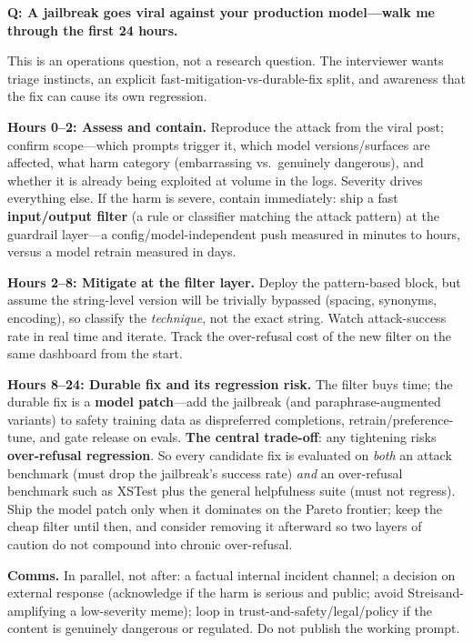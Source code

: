 \begin{interviewq}
\textbf{Q: A jailbreak goes viral against your production model---walk me through the first 24 hours.}

 \quad {} \quad \badgefreq{\freqmed}

\stronganswer

This is an operations question, not a research question. The interviewer wants triage instincts, an explicit fast-mitigation-vs-durable-fix split, and awareness that the fix can cause its own regression.

\textbf{Hours 0--2: Assess and contain.} Reproduce the attack from the viral post; confirm scope---which prompts trigger it, which model versions/surfaces are affected, what harm category (embarrassing vs.\ genuinely dangerous), and whether it is already being exploited at volume in the logs. Severity drives everything else. If the harm is severe, contain immediately: ship a fast \textbf{input/output filter} (a rule or classifier matching the attack pattern) at the guardrail layer---a config/model-independent push measured in minutes to hours, versus a model retrain measured in days.

\textbf{Hours 2--8: Mitigate at the filter layer.} Deploy the pattern-based block, but assume the string-level version will be trivially bypassed (spacing, synonyms, encoding), so classify the \textit{technique}, not the exact string. Watch attack-success rate in real time and iterate. Track the over-refusal cost of the new filter on the same dashboard from the start.

\textbf{Hours 8--24: Durable fix and its regression risk.} The filter buys time; the durable fix is a \textbf{model patch}---add the jailbreak (and paraphrase-augmented variants) to safety training data as dispreferred completions, retrain/preference-tune, and gate release on evals. \textbf{The central trade-off}: any tightening risks \textbf{over-refusal regression}. So every candidate fix is evaluated on \textit{both} an attack benchmark (must drop the jailbreak's success rate) \textit{and} an over-refusal benchmark such as XSTest plus the general helpfulness suite (must not regress). Ship the model patch only when it dominates on the Pareto frontier; keep the cheap filter until then, and consider removing it afterward so two layers of caution do not compound into chronic over-refusal.

\textbf{Comms.} In parallel, not after: a factual internal incident channel; a decision on external response (acknowledge if the harm is serious and public; avoid Streisand-amplifying a low-severity meme); loop in trust-and-safety/legal/policy if the content is genuinely dangerous or regulated. Do not publish the working prompt.


\end{interviewq}
